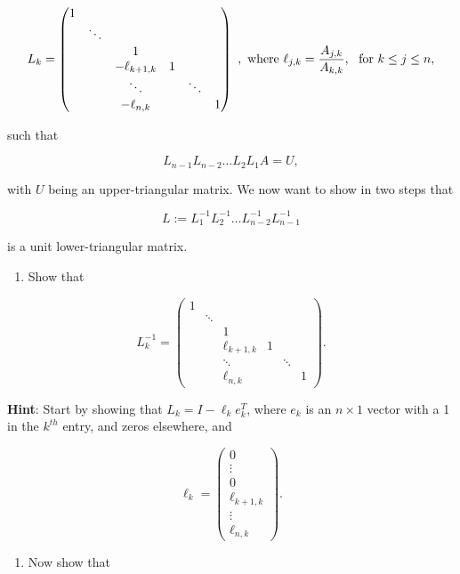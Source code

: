 \documentclass[]{article}
\providecommand{\tightlist}{%
  \setlength{\itemsep}{0pt}\setlength{\parskip}{0pt}}
\begin{document}
\[ L_{k}=\begin{pmatrix} 1 & & & & & \\
& \ddots & & & & \\
& & 1 & & & \\
& & -\ell_{k+1,k} & 1 & & \\
& & \ddots & & \ddots & \\
& & -\ell_{n,k} & &  & 1 
\end{pmatrix}~, \hbox{ where } \ell_{j,k}=\frac{A_{j,k}}{A_{k,k}},~\hbox{ for } k\leq j \leq n, \]

such that

\[ L_{n-1} L_{n-2} \ldots L_{2} L_{1} A = U, \]

with \(U\) being an upper-triangular matrix. We now want to show in two
steps that

\[L:= L_{1}^{-1} L_{2}^{-1} \ldots L_{n-2}^{-1} L_{n-1}^{-1} \]

is a unit lower-triangular matrix.

\begin{enumerate}
\def\labelenumi{(\alph{enumi})}
\tightlist
\item
  Show that
\end{enumerate}

\[  L_{k}^{-1} = \begin{pmatrix} 1 & & & & & \\
& \ddots & & & & \\
& & 1 & & & \\
& & \ell_{k+1,k} & 1 & & \\
& & \ddots & & \ddots & \\
& & \ell_{n,k} & &  & 1 
\end{pmatrix}. \]

\textbf{Hint}: Start by showing that \(L_k=I-\ell_k e_k^{T}\), where
\(e_k\) is an \(n \times 1\) vector with a 1 in the \(k^{th}\) entry,
and zeros elsewhere, and

\[ \ell_k = \begin{pmatrix} 0 \\ \vdots \\ 0 \\ \ell_{k+1,k} \\ \vdots \\ \ell_{n,k} \end{pmatrix}. \]

\begin{enumerate}
\def\labelenumi{(\alph{enumi})}
\setcounter{enumi}{1}
\tightlist
\item
  Now show that
\end{enumerate}
\end{document}
